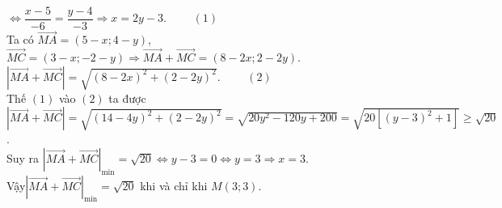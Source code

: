 \begin{bt}
{\begin{enumerate}
			$ \Leftrightarrow\dfrac{x-5}{-6}=\dfrac{y-4}{-3}\Rightarrow x=2y-3$. $\qquad(1)$\\
		 Ta có $\overrightarrow{MA}=(5-x;4-y)$, $\overrightarrow{MC}=(3-x;-2-y) \Rightarrow\overrightarrow{MA}+\overrightarrow{MC}=(8-2x;2-2y)$.\\
		 $ \left|\overrightarrow{MA}+\overrightarrow{MC}\right|=\sqrt{(8-2x)^2+(2-2y)^2}$. $\qquad(2)$\\
		Thế $(1)$ vào $(2)$ ta được\\
		$\left|\overrightarrow{MA}+\overrightarrow{MC}\right|=\sqrt{(14 -4y)^2+(2-2y)^2}=\sqrt{ 20y^2- 120y+ 200}=\sqrt{20 \left[(y-3)^2+1\right]}\ge\sqrt{20}$.\\
		Suy ra $\left|\overrightarrow{MA}+\overrightarrow{MC}\right|_{\min}=\sqrt{20}\Leftrightarrow y- 3=0 \Leftrightarrow y=3\Rightarrow x=3$.\\
		Vậy$ \left|\overrightarrow{MA}+\overrightarrow{MC}\right|_{\min}=\sqrt{20} $ khi và chỉ khi  $M (3;3) $.\\
		\end{enumerate}	
		}
\end{bt}

